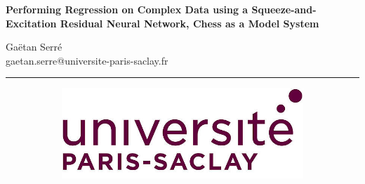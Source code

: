 \documentclass[a4paper]{article}
\begin{document}
\setlength{\parindent}{0pt}

\setlength{\headheight}{13.59999pt}
\addtolength{\topmargin}{-1.59999pt}

\begin{center}
  \vspace*{5cm}

  \textbf{\large Performing Regression on Complex Data using a
  Squeeze-and-Excitation Residual Neural Network, Chess as a Model System}

  \vspace*{1cm}

  Gaëtan Serré \\
  {\ttfamily gaetan.serre@universite-paris-saclay.fr}

  \vspace*{10cm}

  \vfill
  \noindent\rule{\textwidth}{0.4pt}
  \begin{figure}[H]
      \centering
      \begin{subfigure}{.35\textwidth}
          \includegraphics[width=\textwidth]{ups-logo.png}
      \end{subfigure}
  \end{figure}
\end{center}

\pagebreak
\restoregeometry
\pagebreak
{}
\end{document}
